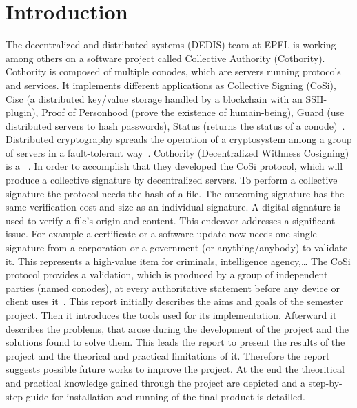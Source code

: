 \documentclass[11pt, a4paper, twoside, openright, openany]{article}
\begin{document}
\begin{center}

\end{center}

\tableofcontents

\clearpage

\section{Introduction}
The decentralized and distributed systems (DEDIS) team at EPFL is working among others on a software project called Collective Authority (Cothority).
Cothority is composed of multiple conodes, which are servers running protocols and services.
It implements different applications as Collective Signing (CoSi), Cisc (a distributed key/value storage handled by a blockchain with an SSH-plugin),
Proof of Personhood (prove the existence of humain-being), Guard (use distributed servers to hash passwords),
Status (returns the status of a conode)~\cite{cothorityWiki}.
\newline \newline
Distributed cryptography spreads the operation of a cryptosystem among a group
of servers in a fault-tolerant way~\cite{definition}.
Cothority (Decentralized Withness Cosigning) is a ~\cite{cothorityInfo}.
\newline
In order to accomplish that they developed the CoSi protocol,
which will produce a collective signature by decentralized servers.
To perform a collective signature the protocol needs the hash of a file.
The outcoming signature has the same verification cost and size as an individual signature.
A digital signature is used to verify a file's origin and content.
\newline
This endeavor addresses a significant issue. For example a certificate or a software
update now needs one single signature from a corporation or a government (or anything/anybody) to validate it.
This represents a high-value item for criminals, intelligence agency,\ldots
\newline
The CoSi protocol provides a validation, which is produced by a group of independent parties (named conodes),
at every authoritative statement before any device or client uses it~\cite{cosi}.
\newline \newline
This report initially describes the aims and goals of the semester project.
Then it introduces the tools used for its implementation.
Afterward it describes the problems, that arose during the development of the project
and the solutions found to solve them.
This leads the report to present the results of the project and the theorical and practical limitations of it.
Therefore the report suggests possible future works to improve the project.
At the end the theoritical and practical knowledge gained through the project are depicted and
a step-by-step guide for installation and running of the final product is detailled.
\bigbreak
\end{document}
